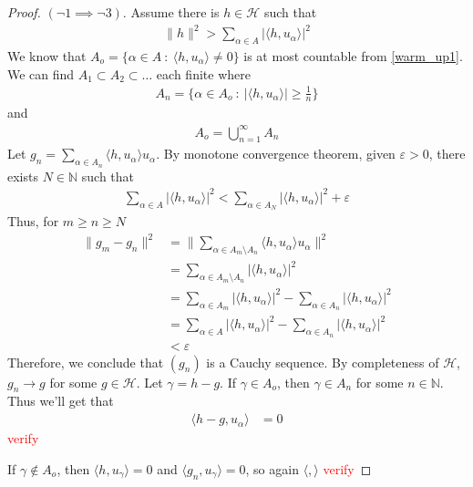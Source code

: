\begin{proof}
  $(\neg 1 \implies \neg 3)$. Assume there is $h \in \mathcal{H}$ such that
  \begin{align*}
    \|h\|^2 > \sum_{\alpha \in  A} |\langle h , u_\alpha \rangle|^2
  \end{align*}
  We know that $A_o = \{ \alpha \in A  \ : \  \langle h , u_\alpha
  \rangle \neq 0 \}$ is at most countable from \autoref{warm_up1}.
  We can find $A_1 \subset A_2 \subset \ldots$ each finite where
  \begin{align*}
    A_n = \{ \alpha \in A_o  \ : \  |\langle h , u_\alpha \rangle |
    \ge \frac{1}{n} \}
  \end{align*}
  and
  \begin{align*}
    A_o = \bigcup_{n = 1}^{\infty}A_n
  \end{align*}
  Let $g_n = \sum_{\alpha \in  A_n} \langle h , u_\alpha \rangle
  u_\alpha$. By monotone convergence theorem, given $\varepsilon> 0$,
  there exists $N \in \mathbb{N}$ such that
  \begin{align*}
    \sum_{\alpha \in  A} |\langle h , u_\alpha \rangle |^2 <
    \sum_{\alpha \in  A_N} |\langle h , u_\alpha \rangle |^2 + \varepsilon
  \end{align*}
  Thus, for $m \ge n \ge N$
  \begin{align*}
    \|g_m - g_n\|^2 &= \|\sum_{\alpha \in  A_m \setminus A_n} \langle
    h , u_\alpha \rangle  u_\alpha\|^2 \\
    &= \sum_{\alpha \in  A_m \setminus A_n} |\langle h , u_\alpha \rangle |^2 \\
    &= \sum_{\alpha \in  A_m} |\langle h , u_\alpha \rangle |^2 -
    \sum_{\alpha \in  A_n} |\langle h , u_\alpha \rangle |^2 \\
    &=  \sum_{\alpha \in  A} |\langle h , u_\alpha \rangle |^2 -
    \sum_{\alpha \in A_n} |\langle h , u_\alpha \rangle |^2 \\
    &< \varepsilon
  \end{align*}
  Therefore, we conclude that $(g_n)$ is a Cauchy sequence. By
  completeness of $\mathcal{H}$, $g_n \to g$ for some $g \in
  \mathcal{H}$. Let $\gamma = h - g$. If $\gamma \in A_o$, then
  $\gamma \in A_n$ for some $n \in \mathbb{N}$. Thus we'll get that
  \begin{align*}
    \langle h-g , u_\alpha \rangle &= 0
  \end{align*}
  \textcolor{red}{verify}

  If $\gamma \notin A_o$, then $\langle h , u_\gamma \rangle = 0$ and
  $\langle g_n , u_\gamma \rangle = 0$, so again $\langle  ,  \rangle
  $ \textcolor{red}{verify}

\end{proof}
